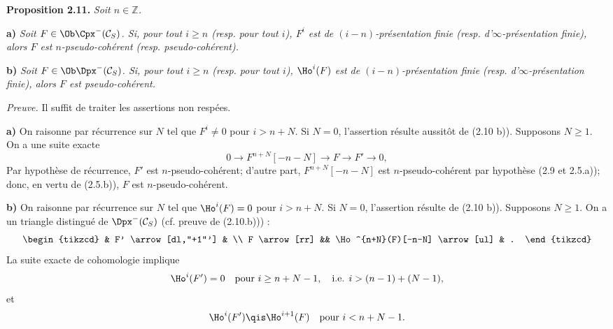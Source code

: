 \textbf{Proposition 2.11.} \emph{Soit \(n\in\mathbb Z\).}

\textbf{a)} \emph{Soit \(F\in\Ob\Cpx^-(\mathcal C_S)\). Si, pour tout \(i\geq n\) (resp. pour tout \(i\)), \(F^i\) est de \((i-n)\)-présentation finie (resp. d'\(\infty\)-présentation finie), alors \(F\) est \(n\)-pseudo-cohérent (resp. pseudo-cohérent).}

\textbf{b)} \emph{Soit \(F\in\Ob\Dpx^-(\mathcal C_S)\). Si, pour tout \(i\geq n\) (resp. pour tout \(i\)), \(\Ho^i(F)\) est de \((i-n)\)-présentation finie (resp. d'\(\infty\)-présentation finie), alors \(F\) est pseudo-cohérent.}

\emph{Preuve.} Il suffit de traiter les assertions non respées.

\textbf{a)} On raisonne par récurrence sur \(N\) tel que \(F^i\neq0\) pour \(i>n+N\). Si \(N=0\), l'assertion résulte aussitôt de (2.10 b)). Supposons \(N\geq1\). On a une suite exacte
\[
  0\longrightarrow F^{n+N}[-n-N]\longrightarrow F\longrightarrow F'\longrightarrow 0,
\]
Par hypothèse de récurrence, \(F'\) est \(n\)-pseudo-cohérent; d'autre part, \(F^{n+N}[-n-N]\) est \(n\)-pseudo-cohérent par hypothèse (2.9 et 2.5.a)); donc, en vertu de (2.5.b)), \(F\) est \(n\)-pseudo-cohérent.

\textbf{b)} On raisonne par récurrence sur \(N\) tel que \(\Ho^i(F)=0\) pour \(i>n+N\). Si \(N=0\), l'assertion résulte de (2.10 b)). Supposons \(N\geq1\). On a un triangle distingué de \(\Dpx^-(\mathcal C_S)\) (cf. preuve de (2.10.b))) :
\[
\begin{tikzcd}
& F' \arrow[dl,"+1"'] & \\
F \arrow[rr] && \Ho^{n+N}(F)[-n-N] \arrow[ul] & .
\end{tikzcd}
\]
La suite exacte de cohomologie implique
\[
  \Ho^i(F')=0\quad\text{pour }i\geq n+N-1,\quad\text{i.e. }i>(n-1)+(N-1),
\]
et
\[
  \Ho^i(F')\qis\Ho^{i+1}(F)\quad\text{pour }i<n+N-1 .
\]
